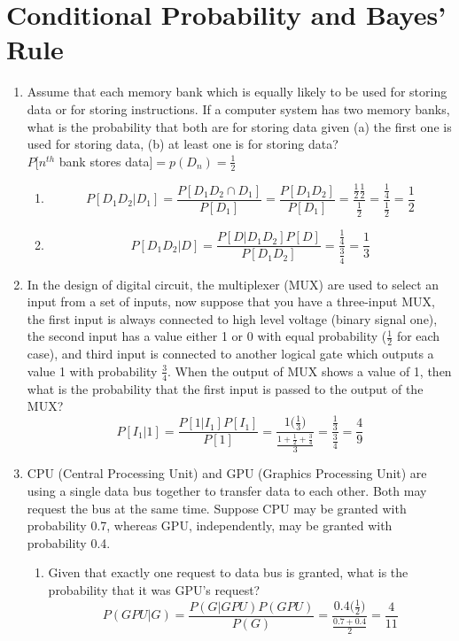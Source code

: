 \documentclass[10.5pt,letterpaper]{article}
\begin{document}
\section{Conditional Probability and Bayes' Rule}
\begin{enumerate}[label=\textbf{Problem \arabic*.}]
\item Assume that each memory bank which is equally likely to be used for storing data or for storing instructions. If a computer system has two memory banks, what is the probability that both are for storing data given (a) the first one is used for storing data, (b) at least one is for storing data?\\
$P[n^{th}$ bank stores data$]=p(D_n)=\frac{1}{2}$
	\begin{enumerate}[label=\alph*)]
\item \[P[D_1D_2|D_1] = \frac{P[D_1D_2 \cap D_1]}{P[D_1]} = \frac{P[D_1D_2]}{P[D_1]}=\frac{\frac{1}{2}\frac{1}{2}}{\frac{1}{2}}=\frac{\frac{1}{4}}{\frac{1}{2}}=\frac{1}{2}\]
\item \[P[D_1D_2|D] = \frac{P[D|D_1D_2]P[D]}{P[D_1D_2]} = \frac{\frac{1}{4}}{\frac{3}{4}}=\frac{1}{3}\]
	\end{enumerate}
\item In the design of digital circuit, the multiplexer (MUX) are used to select an input from a set of inputs, now suppose that you have a three-input MUX, the first input is always connected to high level voltage (binary signal one), the second input has a value either 1 or 0 with equal probability ($\frac{1}{2}$ for each case), and third input is connected to another logical gate which outputs a value 1 with probability $\frac{3}{4}$. When the output of MUX shows a value of 1, then what is the probability that the first input is passed to the output of the MUX?
\[P[I_1|1]=\frac{P[1|I_1]P[I_1]}{P[1]}=\frac{1\big(\frac{1}{3}\big)}{\frac{1+\frac{1}{2}+\frac{3}{4}}{3}}=\frac{\frac{1}{3}}{\frac{3}{4}}=\frac{4}{9}\]
\item CPU (Central Processing Unit) and GPU (Graphics Processing Unit) are using a single data bus together to transfer data to each other. Both may request the bus at the same time. Suppose CPU may be granted with probability 0.7, whereas GPU, independently, may be granted with probability 0.4.
	\begin{enumerate}[label=\alph*)]
\item Given that exactly one request to data bus is granted, what is the probability that it was GPU's request?
\[P(GPU|G)=\frac{P(G|GPU)P(GPU)}{P(G)}=\frac{0.4\big(\frac{1}{2}\big)}{\frac{0.7+0.4}{2}}=\frac{4}{11}\]

\end{enumerate}
\end{enumerate}
\end{document}
